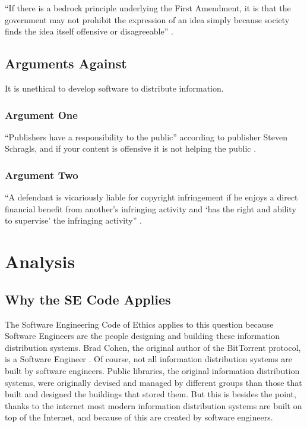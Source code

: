 \documentclass[11pt]{article}
\begin{document}
``If there is a bedrock principle underlying the First Amendment, it is that the government may not prohibit the expression of an idea simply because society finds the idea itself offensive or disagreeable'' \cite[414]{1989texas}.

\subsection{Arguments Against}
It is unethical to develop software to distribute information.

\subsubsection{Argument One}

``Publishers have a responsibility to the public'' according to publisher Steven Schragls, and if your content is offensive it is not helping the public \cite[46]{hawker}.

\subsubsection{Argument Two}

``A defendant is vicariously liable for copyright infringement if he enjoys a direct financial benefit from another's infringing activity and `has the right and ability to supervise' the infringing activity'' \cite{2000m}.

\section{Analysis}

\subsection{Why the SE Code Applies}

The Software Engineering Code of Ethics applies to this question because Software Engineers are the people designing and building these information distribution systems. Brad Cohen, the original author of the BitTorrent protocol, is a Software Engineer \cite{cohen}. Of course, not all information distribution systems are built by software engineers. Public libraries, the original information distribution systems, were originally devised and managed by different groups than those that built and designed the buildings that stored them. But this is besides the point, thanks to the internet most modern information distribution systems are built on top of the Internet, and because of this are created by software engineers.
\end{document}
